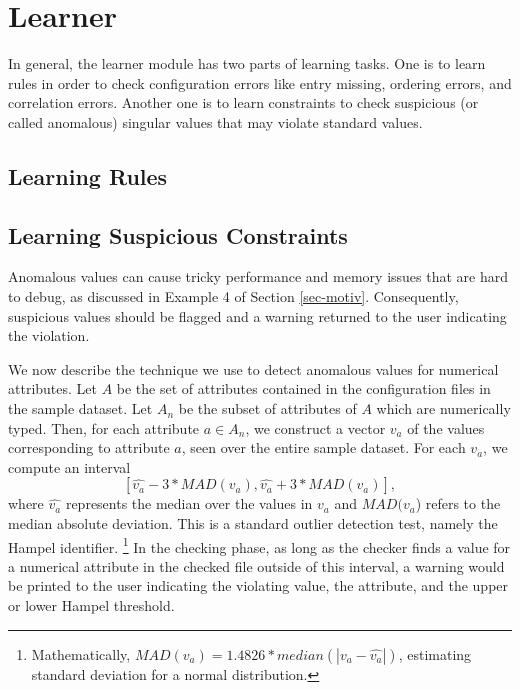 
\section{Learner}
\label{sec-learn}


In general, the learner module has two parts of learning tasks.
One is to learn rules in order to check configuration errors like
entry missing, ordering errors, and correlation errors.
Another one is to learn constraints to check suspicious (or called
anomalous) singular values that may violate standard values.

\subsection{Learning Rules}
\label{subsec-rules}

\subsection{Learning Suspicious Constraints}
\label{subsec-constraints}
Anomalous values can cause tricky performance and memory issues that are hard to debug,
as discussed in Example 4 of Section \ref{sec-motiv}. Consequently, suspicious values 
should be flagged and a warning returned to the user indicating the violation.

We now describe the technique we use to detect anomalous values for 
numerical attributes. Let $A$ be the set of attributes contained in the 
configuration files in the sample dataset. 
Let $A_n$ be the subset of attributes of $A$ which are numerically typed. 
Then, for each attribute $a \in A_n$, we construct a vector $v_a$ of the 
values corresponding to attribute $a$, seen over the entire sample dataset.
For each $v_a$, we compute 
an interval  $$[\hat{v_a} - 3*MAD(v_a), \hat{v_a} + 3*MAD(v_a)],$$ 
where $\hat{v_a}$ represents the median over the values 
in $v_a$ and $MAD(v_a$) refers to the 
median absolute deviation. 
This is a standard outlier detection test, namely the Hampel identifier. 
\footnote{Mathematically, $MAD(v_a) = 1.4826* median(|v_a - \hat{v_a}|)$, estimating standard deviation 
for a normal distribution.} 
In the checking phase, as long as the checker finds a value for a numerical 
attribute in the checked file outside of this interval, 
a warning would be printed to the user indicating the violating value, 
the attribute, and the upper or lower Hampel threshold. 

